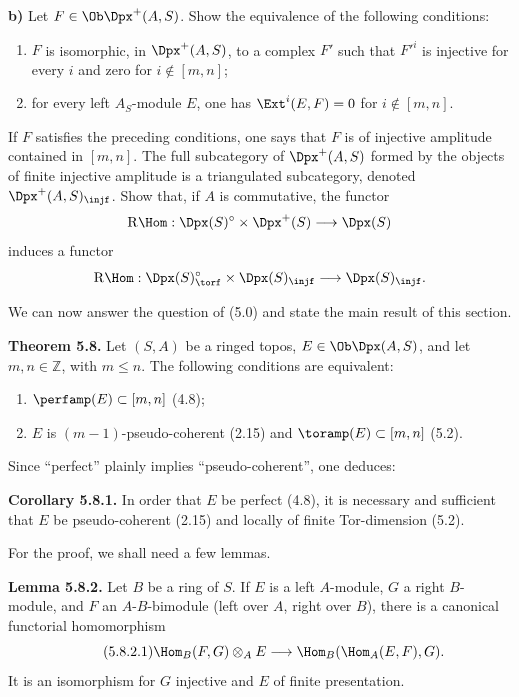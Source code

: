 \documentclass[11pt]{article}
\begin{document}
\textbf{b)} Let \(F\in\Ob\Dpx^+(A,S)\). Show the equivalence of the following conditions:
\begin{enumerate}[label=(\roman*)]
\item \(F\) is isomorphic, in \(\Dpx^+(A,S)\), to a complex \(F'\) such that \(F'^i\) is injective for every \(i\) and zero for \(i\notin[m,n]\);
\item for every left \(A_S\)-module \(E\), one has \(\Ext^i(E,F)=0\) for \(i\notin[m,n]\).
\end{enumerate}
If \(F\) satisfies the preceding conditions, one says that \(F\) is of injective amplitude contained in \([m,n]\). The full subcategory of \(\Dpx^+(A,S)\) formed by the objects of finite injective amplitude is a triangulated subcategory, denoted \(\Dpx^+(A,S)_{\injf}\). Show that, if \(A\) is commutative, the functor
\[
  \mathrm R\Hom:\Dpx(S)^\circ\times\Dpx^+(S)\longrightarrow \Dpx(S)
\]
induces a functor
\[
  \mathrm R\Hom:\Dpx(S)^\circ_{\torf}\times\Dpx(S)_{\injf}
  \longrightarrow \Dpx(S)_{\injf}.
\]

We can now answer the question of (5.0) and state the main result of this section.

\textbf{Theorem 5.8.} Let \((S,A)\) be a ringed topos, \(E\in\Ob\Dpx(A,S)\), and let \(m,n\in\mathbb Z\), with \(m\leq n\). The following conditions are equivalent:
\begin{enumerate}[label=(\roman*)]
\item \(\perfamp(E)\subset[m,n]\) (4.8);
\item \(E\) is \((m-1)\)-pseudo-coherent (2.15) and \(\toramp(E)\subset[m,n]\) (5.2).
\end{enumerate}
Since ``perfect'' plainly implies ``pseudo-coherent'', one deduces:

\textbf{Corollary 5.8.1.} In order that \(E\) be perfect (4.8), it is necessary and sufficient that \(E\) be pseudo-coherent (2.15) and locally of finite Tor-dimension (5.2).

For the proof, we shall need a few lemmas.

\textbf{Lemma 5.8.2.} Let \(B\) be a ring of \(S\). If \(E\) is a left \(A\)-module, \(G\) a right \(B\)-module, and \(F\) an \(A\)-\(B\)-bimodule (left over \(A\), right over \(B\)), there is a canonical functorial homomorphism
\begin{equation}\tag{5.8.2.1}
  \Hom_B(F,G)\otimes_A E
  \longrightarrow
  \Hom_B(\Hom_A(E,F),G).
\end{equation}
It is an isomorphism for \(G\) injective and \(E\) of finite presentation.
\end{document}
